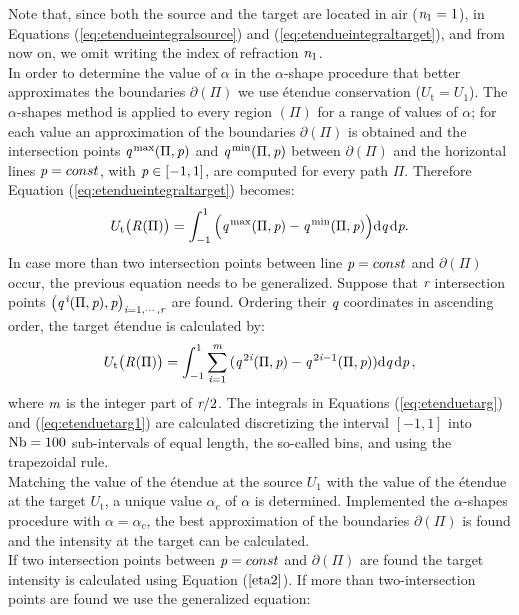 Note that, since both the source and the target are located in air ($\textit{n}_1=1$), in Equations (\ref{eq:etendueintegralsource}) and (\ref{eq:etendueintegraltarget}), and from now on, we omit writing the index of refraction $\textit{n}_1$.
\\ \indent In order to determine the value of $\alpha$ in the $\alpha$-shape procedure that better approximates the boundaries $\partial$$(\Pi)$ we use \'{e}tendue conservation ($U_{\textrm{t}}= U_1$). The $\alpha$-shapes method is applied to every region $(\Pi)$ for a range of values of $\alpha$;
   for each value an approximation of the boundaries $\partial$$(\Pi)$ is obtained and
   the intersection points $\textit{q}^{\textrm{\,max}}(\Pi,\textit{p})$ and $\textit{q}^{\textrm{\,min}}(\Pi,\textit{p})$ between $\partial$$(\Pi)$
and the horizontal lines $\textit{p}=const$, with $\textit{p}\in[-1,1]$, are computed for every path $\Pi$.
Therefore Equation (\ref{eq:etendueintegraltarget}) becomes:
\begin{equation}\label{eq:etenduetarg}
 U_\textrm{t}\big(\mbox{$\emph{R}_{\textit{}}$}(\Pi)\big)= \int_{-1}^{1}{\Big(\textit{q}^{\textrm{\,max}}(\Pi,\textit{p})-\textit{q}^{\textrm{\,min}}(\Pi,\textit{p})\Big)} \textrm{d}\textit{q}\,\textrm{d}\textit{p}.
\end{equation} In case more than two intersection points between line $\textit{p}=const$ and $\partial$$(\Pi)$ occur, the previous equation needs to be generalized. Suppose that $\textit{r}$ intersection points $\big(\textit{q}^{\,\textit{i}}(\Pi,\textit{p}), \textit{p}\big)_{\textit{i} = 1, \cdots, \textit{r}}$ are found. 
Ordering their $\textit{q}$ coordinates in ascending order, the target \'{e}tendue is calculated by:
\begin{equation}\label{eq:etenduetarg1}
 U_\textrm{t}\big(\mbox{$\emph{R}_{\textit{}}$}(\Pi)\big) = \int_{-1}^{1}\sum_{\textit{i} = 1}^{\textit{m}}
{(\textit{q}^{\,2\textit{i}}(\Pi,\textit{p})}-{\textit{q}^{\,2\textit{i}-1} (\Pi, \textit{p}) )} \textrm{d}\textit{q}\,\textrm{d}\textit{p}\,,
\end{equation}
where $\textit{m}$ is the integer part of $\textit{r}/2$. 
The integrals in Equations (\ref{eq:etenduetarg}) and (\ref{eq:etenduetarg1}) are calculated discretizing the interval $[-1, 1]$
   into $\textrm{Nb}=100$ sub-intervals of equal length, the so-called bins, and using the trapezoidal rule.
\\ \indent Matching the value of the \'{e}tendue at the source $U_1$ with the value of the \'{e}tendue at the target $U_{\textrm{t}}$, a unique value $\alpha_{c}$ of $\alpha$  is determined. Implemented the $\alpha$-shapes procedure with $\alpha = \alpha_c$, the best approximation of the boundaries $\partial$$(\Pi)$ is found and the intensity at the target can be calculated.\\ \indent If two intersection points between $\textit{p}=const$ and $\partial$$(\Pi)$ are found the target intensity is calculated using Equation ($\ref{eta2}$). If more than two-intersection points are found we use the generalized equation:
